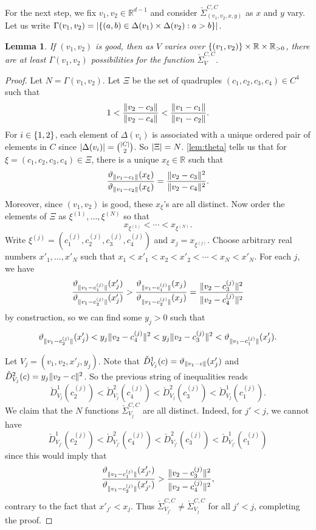 \documentclass[11pt]{amsart}
\newtheorem{lemma}[theorem]{Lemma}
\theoremstyle{definition}
\DeclarePairedDelimiter{\set}{\{}{\}}
\DeclarePairedDelimiter{\abs}{\lvert}{\rvert}
\DeclarePairedDelimiter{\Abs}{\lVert}{\rVert}
\newcommand{\RR}{\mathbb{R}}
\begin{document}
For the next step, we fix $v_1, v_2 \in \RR^{d-1}$ and consider $\check \Sigma^{C,C}_{(v_1,v_2,x,y)}$ as $x$ and $y$ vary. Let us write $\Gamma(v_1,v_2)= \abs{\set{(a,b)\in \Delta(v_1) \times \Delta(v_2) : a > b}}$.
\begin{lemma} \label{lem:gdd}
If $(v_1, v_2)$ is good, then as $V$ varies over $\set{(v_1,v_2)} \times \RR \times \RR_{>0}$, there are at least $\Gamma(v_1, v_2)$ possibilities for the function $\check \Sigma^{C,C}_V$.
\end{lemma}
\begin{proof}
Let $N = \Gamma(v_1,v_2)$. Let $\Xi$ be the set of quadruples $(c_1, c_2, c_3, c_4) \in C^4$ such that
\[1 < \frac{\Abs{v_2 - c_3}}{\Abs{v_2 - c_4}} < \frac{\Abs{v_1 - c_1}}{\Abs{v_1 - c_2}}.\]
For $i\in\set{1,2}$, each element of $\Delta(v_i)$ is associated with a unique ordered pair of elements in $C$ since $\abs{\Delta(v_i)}=\binom{\abs{C}}{2}$. So $\abs{\Xi}=N$.  \cref{lem:theta} tells us that for $\xi=(c_1,c_2,c_3,c_4) \in \Xi$, there is a unique $x_{\xi} \in \RR$ such that
\[\frac{\vartheta_{\Abs{v_1 - c_1}}(x_{\xi})}{\vartheta_{\Abs{v_1 - c_2}}(x_{\xi})} = \frac{\Abs{v_2 - c_3}^2}{\Abs{v_2 - c_4}^2}.\]
Moreover, since $(v_1,v_2)$ is good, these $x_{\xi}$'s are all distinct. Now order the elements of $\Xi$ as $\xi^{(1)}, \ldots, \xi^{(N)}$ so that
\[x_{\xi^{(1)}}<\cdots<x_{\xi^{(N)}}.\]
Write $\xi^{(j)}=(c_1^{(j)}, c_2^{(j)},c_3^{(j)}, c_4^{(j)})$ and $x_j=x_{\xi^{(j)}}$.  Choose arbitrary real numbers $x'_1, \ldots, x'_N$ such that
$x_1 < x'_1 < x_2 < x'_2 < \cdots < x_N < x'_N$.
For each $j$, we have
\[\frac{\vartheta_{\Abs{v_1 - c^{(j)}_1}}(x'_j)}{\vartheta_{\Abs{v_1 - c^{(j)}_2}}(x'_j)} > \frac{\vartheta_{\Abs{v_1 - c^{(j)}_1}}(x_j)}{\vartheta_{\Abs{v_1 - c^{(j)}_2}}(x_j)} = \frac{\Abs{v_2 - c^{(j)}_3}^2}{\Abs{v_2 - c^{(j)}_4}^2}\]
by construction, so we can find some $y_j > 0$ such that
\[\vartheta_{\Abs{v_1 - c^{(j)}_2}}(x'_j) < y_j\Abs{v_2 - c^{(j)}_4}^2 < y_j\Abs{v_2 - c^{(j)}_3}^2 < \vartheta_{\Abs{v_1 - c^{(j)}_1}}(x'_j).\]

Let $V_j = (v_1,v_2,x'_j, y_j)$.  Note that $\check D^1_{V_j}(c) = \vartheta_{\Abs{v_1 - c}}(x'_j)$ and $\check D^2_{V_j}(c) = y_j \Abs{v_2 - c}^2$. So the previous string of inequalities reads
\[\check D^1_{V_j}(c^{(j)}_2) < \check D^2_{V_j}(c^{(j)}_4) < \check D^2_{V_j}(c^{(j)}_3)< \check D^1_{V_j}(c^{(j)}_1).\]
We claim that the $N$ functions $\check \Sigma_{V_j}^{C,C}$ are all distinct.  Indeed, for $j' < j$, we cannot have
\[\check D^1_{V_{j'}}(c^{(j)}_2) < \check D^2_{V_{j'}}(c^{(j)}_4) < \check D^2_{V_{j'}}(c^{(j)}_3)< \check D^1_{V_{j'}}(c^{(j)}_1)\]
since this would imply that
\[
\frac{\vartheta_{\Abs{v_1 - c^{(j)}_1}}(x'_{j'})}{\vartheta_{\Abs{v_1 - c^{(j)}_2}}(x'_{j'})} >  \frac{\Abs{v_2 - c^{(j)}_3}^2}{\Abs{v_2 - c^{(j)}_4}^2},\]
contrary to the fact that $x'_{j'} < x_j$. Thus $\check \Sigma^{C,C}_{V_{j'}} \neq \check \Sigma^{C,C}_{V_j}$ for all $j' < j$, completing the proof. 
\end{proof}
\end{document}
